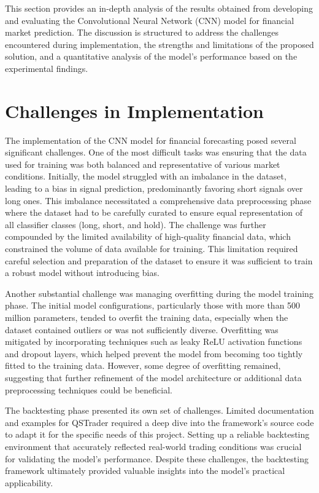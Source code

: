 \thesisspacing %

This section provides an in-depth analysis of the results obtained from developing and evaluating the Convolutional Neural Network (CNN) model for financial market prediction. The discussion is structured to address the challenges encountered during implementation, the strengths and limitations of the proposed solution, and a quantitative analysis of the model's performance based on the experimental findings.

\section{Challenges in Implementation}

The implementation of the CNN model for financial forecasting posed several significant challenges. One of the most difficult tasks was ensuring that the data used for training was both balanced and representative of various market conditions. Initially, the model struggled with an imbalance in the dataset, leading to a bias in signal prediction, predominantly favoring short signals over long ones. This imbalance necessitated a comprehensive data preprocessing phase where the dataset had to be carefully curated to ensure equal representation of all classifier classes (long, short, and hold). The challenge was further compounded by the limited availability of high-quality financial data, which constrained the volume of data available for training. This limitation required careful selection and preparation of the dataset to ensure it was sufficient to train a robust model without introducing bias.

Another substantial challenge was managing overfitting during the model training phase. The initial model configurations, particularly those with more than 500 million parameters, tended to overfit the training data, especially when the dataset contained outliers or was not sufficiently diverse. Overfitting was mitigated by incorporating techniques such as leaky ReLU activation functions and dropout layers, which helped prevent the model from becoming too tightly fitted to the training data. However, some degree of overfitting remained, suggesting that further refinement of the model architecture or additional data preprocessing techniques could be beneficial.

The backtesting phase presented its own set of challenges. Limited documentation and examples for QSTrader required a deep dive into the framework’s source code to adapt it for the specific needs of this project. Setting up a reliable backtesting environment that accurately reflected real-world trading conditions was crucial for validating the model's performance. Despite these challenges, the backtesting framework ultimately provided valuable insights into the model's practical applicability.

